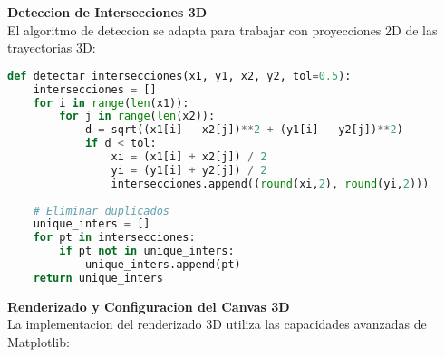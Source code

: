 \documentclass[12pt,a4paper]{article}
\begin{document}
\textbf{Deteccion de Intersecciones 3D}\\

El algoritmo de deteccion se adapta para trabajar con proyecciones 2D de las trayectorias 3D:

\begin{lstlisting}[language=Python, caption=Algoritmo de intersecciones 3D]
def detectar_intersecciones(x1, y1, x2, y2, tol=0.5):
    intersecciones = []
    for i in range(len(x1)):
        for j in range(len(x2)):
            d = sqrt((x1[i] - x2[j])**2 + (y1[i] - y2[j])**2)
            if d < tol:
                xi = (x1[i] + x2[j]) / 2
                yi = (y1[i] + y2[j]) / 2
                intersecciones.append((round(xi,2), round(yi,2)))
    
    # Eliminar duplicados
    unique_inters = []
    for pt in intersecciones:
        if pt not in unique_inters:
            unique_inters.append(pt)
    return unique_inters
\end{lstlisting}

\textbf{Renderizado y Configuracion del Canvas 3D}\\

La implementacion del renderizado 3D utiliza las capacidades avanzadas de Matplotlib:
\end{document}

